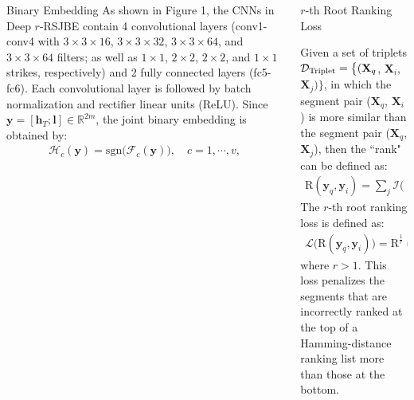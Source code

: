\documentclass[final]{beamer}
\newlength{\onecolwid}
\newlength{\twocolwid}
\begin{document}
\begin{frame}[t]
\begin{columns}[t]
\begin{column}{\twocolwid}
\begin{columns}[t,totalwidth=\twocolwid]
\begin{column}{\onecolwid}
\begin{block}{Binary Embedding}
As shown in Figure 1,  the CNNs in Deep $r$-RSJBE contain 4 convolutional layers (conv1-conv4 with $3\times 3\times 16$, $3\times 3\times 32$, $3\times 3\times 64$, and $3\times 3\times 64$ filters; as well as $1\times 1$, $2\times 2$, $2\times 2$, and $1\times 1$ strikes, respectively) and 2 fully connected layers (fc5-fc6). Each convolutional layer is followed by batch normalization and rectifier linear units (ReLU). Since $\bm{y}=[\bm{h}_T; \bm{l}]\in\mathbb{R}^{2m}$, the joint binary embedding is obtained by:
\begin{equation}\label{hash_fun}
\begin{aligned}
\mathcal{H}_c(\bm{y})=\mathrm{sgn}\big(\mathcal{F}_c(\bm{y})\big),\quad c=1,\cdots,v,
\end{aligned}
\end{equation}

\end{block}


\end{column} %

\begin{column}{\onecolwid}\vspace{-.6in} %


\begin{block}{$r$-th Root Ranking Loss}


Given a set of triplets
$\mathcal{D}_{\rm{Triplet}}=\big\{(\mathbf{X}_{q}$, $\mathbf{X}_{i}$, $\mathbf{X}_{j})\big\}$,
in which the segment pair ($\mathbf{X}_{q}$, $\mathbf{X}_{i}$) is more similar than
the segment pair ($\mathbf{X}_{q}$, $\mathbf{X}_{j}$), then the ``rank" can be
defined as:
\begin{equation}\label{Rank}
\begin{aligned}
\mathrm{R}(\bm{y}_{q},\bm{y}_{i})=\sum_{j}\mathcal{I}\Big(
&\big\|\mathcal{H}(\bm{y}_{q})-\mathcal{H}(\bm{y}_{j})\big\|_{\mathrm{H}}
\le \big\|\mathcal{H}(\bm{y}_{q})-\mathcal{H}(\bm{y}_{i})\big\|_{\mathrm{H}}
\Big) \nonumber
\end{aligned}
\end{equation}
The $r$-th root ranking loss is defined as:
\begin{equation}\label{Loss}
\begin{aligned}
\mathcal{L}\big(\mathrm{R}(\bm{y}_{q},\bm{y}_{i})\big)=\mathrm{R}^{\frac{1}{r}}(\bm{y}_{q},\bm{y}_{i}),
\end{aligned}
\end{equation}
where $r>1$. This loss penalizes the segments that are incorrectly ranked at the top of a Hamming-distance ranking list
more than those at the bottom.


\end{block}
\end{column}
\end{columns}
\end{column}
\end{columns}
\end{frame}
\end{document}
